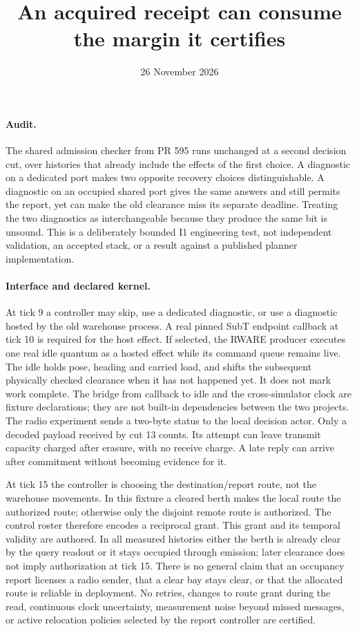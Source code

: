 \documentclass[11pt]{article}
\begin{document}
\title{An acquired receipt can consume the margin it certifies}
\author{}
\date{26 November 2026}
\maketitle

\paragraph{Audit.}
The shared admission checker from PR 595 runs unchanged at a second
decision cut, over histories that already include the effects of the
first choice. A diagnostic on a dedicated port makes two opposite
recovery choices distinguishable. A diagnostic on an occupied shared
port gives the same answers and still permits the report, yet can make
the old clearance miss its separate deadline. Treating the two
diagnostics as interchangeable because they produce the same bit is
unsound. This is a deliberately bounded I1 engineering test, not
independent validation, an accepted stack, or a result against a
published planner implementation.

\paragraph{Interface and declared kernel.}
At tick 9 a controller may skip, use a dedicated diagnostic, or use
a diagnostic hosted by the old warehouse process. A real pinned SubT
endpoint callback at tick 10 is required for the host effect. If
selected, the RWARE producer executes one real idle quantum as a hosted
effect while its command queue remains live. The idle holds pose,
heading and carried load, and shifts the subsequent physically checked
clearance when it has not happened yet. It does not mark work complete.
The bridge from callback to idle and the cross-simulator clock are
fixture declarations; they are not built-in dependencies between the
two projects. The radio experiment sends a two-byte status to the local
decision actor. Only a decoded payload received by cut 13 counts. Its
attempt can leave transmit capacity charged after erasure, with no
receive charge. A late reply can arrive after commitment without
becoming evidence for it.

At tick 15 the controller is choosing the destination/report route,
not the warehouse movements. In this fixture a cleared berth makes
the local route the authorized route; otherwise only the disjoint
remote route is authorized. The control roster therefore encodes a
reciprocal grant. This grant and its temporal validity are authored.
In all measured histories either the berth is already clear by the
query readout or it stays occupied through emission; later clearance
does not imply authorization at tick 15. There is no general claim
that an occupancy report licenses a radio sender, that a clear bay
stays clear, or that the allocated route is reliable in deployment.
No retries, changes to route grant during the read, continuous clock
uncertainty, measurement noise beyond missed messages, or active
relocation policies selected by the report controller are certified.
\end{document}
